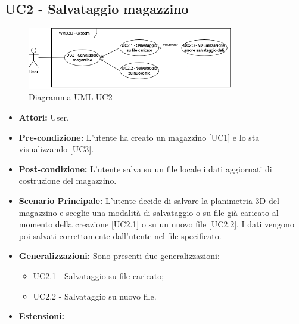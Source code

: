 \subsection{UC2 - Salvataggio magazzino}
\begin{figure}[H]
  \centering
  \includegraphics[width=0.8\textwidth]{UC_diagrams_1-10/UC2_sys.drawio.png}
   \caption{Diagramma UML UC2}
\end{figure}
\begin{itemize}
    \item \textbf{Attori:} User.
    \item \textbf{Pre-condizione:}  L'utente ha creato un magazzino [UC1] e lo sta visualizzando [UC3].
    \item \textbf{Post-condizione:} L'utente salva su un file locale i dati aggiornati di costruzione del magazzino.
    \item \textbf{Scenario Principale:}  L'utente decide di salvare la planimetria 3D del magazzino e sceglie una modalità di salvataggio o su file già caricato al momento della creazione [UC2.1] o su un nuovo file [UC2.2]. I dati vengono poi salvati correttamente dall'utente nel file specificato.
    \item \textbf{Generalizzazioni:} Sono presenti due generalizzazioni:
    \begin{itemize}
        \item UC2.1 - Salvataggio su file caricato;
        \item UC2.2 - Salvataggio su nuovo file.
    \end{itemize}
    \item \textbf{Estensioni:} -
\end{itemize}


